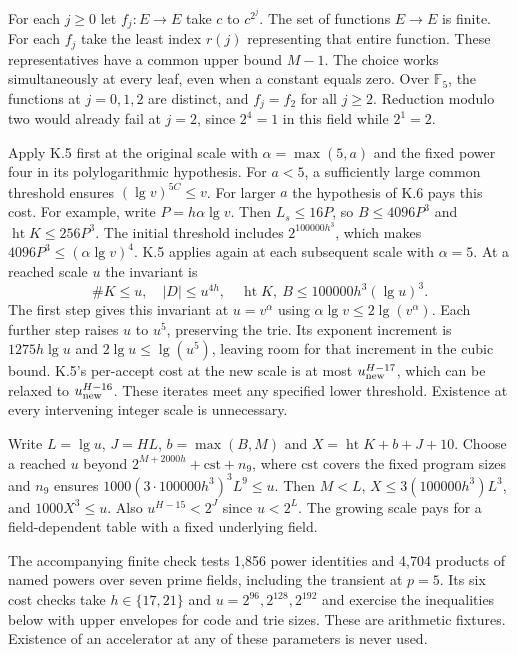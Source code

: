 
\clearpage
{}
For each $j\ge0$ let $f_j:E\to E$ take $c$ to $c^{2^j}$. The set of functions $E\to E$ is finite. For each $f_j$ take the least index $r(j)$ representing that entire function. These representatives have a common upper bound $M-1$. The choice works simultaneously at every leaf, even when a constant equals zero. Over $\mathbb F_5$, the functions at $j=0,1,2$ are distinct, and $f_j=f_2$ for all $j\ge2$. Reduction modulo two would already fail at $j=2$, since $2^4=1$ in this field while $2^1=2$.

Apply K.5 first at the original scale with $\alpha=\max(5,a)$ and the fixed power four in its polylogarithmic hypothesis. For $a<5$, a sufficiently large common threshold ensures $(\lg v)^{5C}\le v$. For larger $a$ the hypothesis of K.6 pays this cost. For example, write $P=h\alpha\lg v$. Then $L_s\le16P$, so $B\le4096P^3$ and $\operatorname{ht}K\le256P^3$. The initial threshold includes $2^{100000h^3}$, which makes $4096P^3\le(\alpha\lg v)^4$. K.5 applies again at each subsequent scale with $\alpha=5$. At a reached scale $u$ the invariant is
\[
 \#K\le u,\quad |D|\le u^{4h},\quad
 \operatorname{ht}K,\ B\le 100000h^3(\lg u)^3 .
\]
The first step gives this invariant at $u=v^\alpha$ using $\alpha\lg v\le2\lg(v^\alpha)$. Each further step raises $u$ to $u^5$, preserving the trie. Its exponent increment is $1275h\lg u$ and $2\lg u\le\lg(u^5)$, leaving room for that increment in the cubic bound. K.5's per-accept cost at the new scale is at most $u_{\rm new}^{H-17}$, which can be relaxed to $u_{\rm new}^{H-16}$. These iterates meet any specified lower threshold. Existence at every intervening integer scale is unnecessary.

Write $L=\lg u$, $J=HL$, $b=\max(B,M)$ and $X=\operatorname{ht}K+b+J+10$. Choose a reached $u$ beyond $2^{M+2000h}+\mathrm{cst}+n_9$, where $\mathrm{cst}$ covers the fixed program sizes and $n_9$ ensures $1000(3\cdot100000h^3)^3 L^9\le u$. Then $M<L$, $X\le3(100000h^3)L^3$, and $1000X^3\le u$. Also $u^{H-15}<2^J$ since $u<2^L$. The growing scale pays for a field-dependent table with a fixed underlying field.

The accompanying finite check tests 1,856 power identities and 4,704 products of named powers over seven prime fields, including the transient at $p=5$. Its six cost checks take $h\in\{17,21\}$ and $u=2^{96},2^{128},2^{192}$ and exercise the inequalities below with upper envelopes for code and trie sizes. These are arithmetic fixtures. Existence of an accelerator at any of these parameters is never used.

